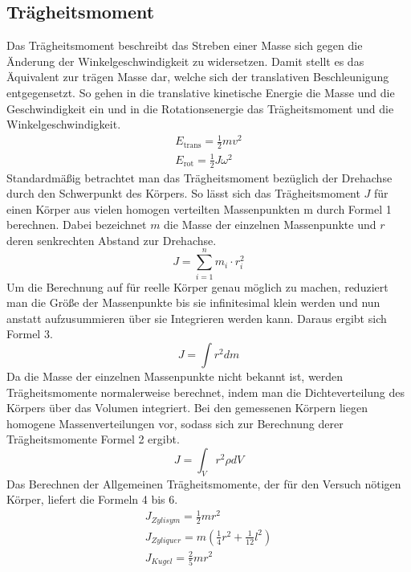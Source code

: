 \documentclass[titlepage = firstcover]{scrartcl}
\begin{document}
      \subsection{Trägheitsmoment}
      Das Trägheitsmoment beschreibt das Streben einer Masse sich gegen die Änderung der Winkelgeschwindigkeit zu widersetzen. Damit stellt es 
      das Äquivalent zur trägen Masse dar, welche sich der translativen Beschleunigung entgegensetzt. So gehen in die translative kinetische Energie
      die Masse und die Geschwindigkeit ein und in die Rotationsenergie das Trägheitsmoment und die Winkelgeschwindigkeit.
      \begin{align*}
        E_{\text{trans}} = \frac{1}{2} mv^2 \\
        E_{\text{rot}} = \frac{1}{2}J \omega^2
      \end{align*}
      Standardmäßig betrachtet man das Trägheitsmoment bezüglich der Drehachse durch den Schwerpunkt des Körpers. So lässt sich das Trägheitsmoment 
      $J$ für einen Körper aus vielen homogen verteilten Massenpunkten m durch Formel 1 berechnen. Dabei bezeichnet $m$ die Masse der einzelnen 
      Massenpunkte und $r$ deren senkrechten Abstand zur Drehachse.
      \begin{equation}
        J = \sum_{i=1}^n m_i \cdot r_i^2
      \end{equation}
      Um die Berechnung auf für reelle Körper genau möglich zu machen, reduziert man die Größe der Massenpunkte bis sie infinitesimal klein werden und  
      nun anstatt aufzusummieren über sie Integrieren werden kann. Daraus ergibt sich Formel 3.
      \begin{equation}
        J = \int r^2 dm
      \end{equation}
      Da die Masse der einzelnen Massenpunkte nicht bekannt ist, werden Trägheitsmomente normalerweise berechnet, indem man die Dichteverteilung des Körpers 
      über das Volumen integriert. Bei den gemessenen Körpern liegen homogene Massenverteilungen vor, sodass sich zur Berechnung derer Trägheitsmomente 
      Formel 2 ergibt.  
      \begin{equation}
        J = \int_V r^2 \rho dV
      \end{equation}
      Das Berechnen der Allgemeinen Trägheitsmomente, der für den Versuch nötigen Körper, liefert die Formeln 4 bis 6.
      \begin{align}
        J_{Zylisym} = \frac{1}{2}mr^2 \\
        J_{Zyliquer} = m(\frac{1}{4}r^2 + \frac{1}{12}l^2) \\
        J_{Kugel} = \frac{2}{5}mr^2
      \end{align}
\end{document}
